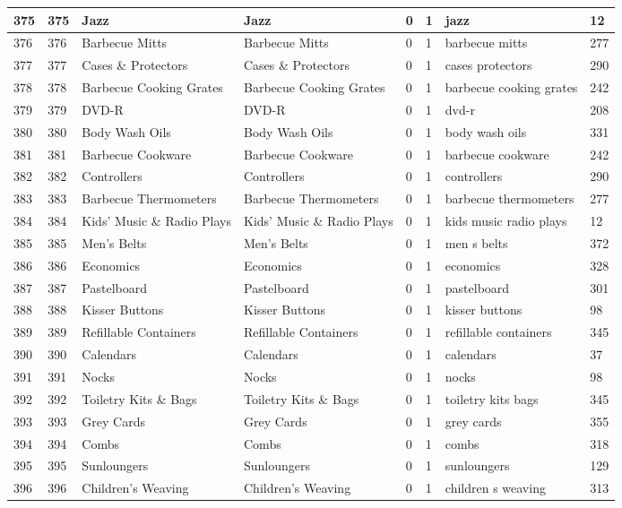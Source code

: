\begin{longtable}{|l|l|l|l|l|l|l|l|}
375 & 375 & Jazz & Jazz & 0 & 1 & jazz & 12 \\ \hline 
376 & 376 & Barbecue Mitts & Barbecue Mitts & 0 & 1 & barbecue mitts & 277 \\ \hline 
377 & 377 & Cases \& Protectors & Cases \& Protectors & 0 & 1 & cases protectors & 290 \\ \hline 
378 & 378 & Barbecue Cooking Grates & Barbecue Cooking Grates & 0 & 1 & barbecue cooking grates & 242 \\ \hline 
379 & 379 & DVD-R & DVD-R & 0 & 1 & dvd-r & 208 \\ \hline 
380 & 380 & Body Wash Oils & Body Wash Oils & 0 & 1 & body wash oils & 331 \\ \hline 
381 & 381 & Barbecue Cookware & Barbecue Cookware & 0 & 1 & barbecue cookware & 242 \\ \hline 
382 & 382 & Controllers & Controllers & 0 & 1 & controllers & 290 \\ \hline 
383 & 383 & Barbecue Thermometers & Barbecue Thermometers & 0 & 1 & barbecue thermometers & 277 \\ \hline 
384 & 384 & Kids' Music \& Radio Plays & Kids' Music \& Radio Plays & 0 & 1 & kids music radio plays & 12 \\ \hline 
385 & 385 & Men's Belts & Men's Belts & 0 & 1 & men s belts & 372 \\ \hline 
386 & 386 & Economics & Economics & 0 & 1 & economics & 328 \\ \hline 
387 & 387 & Pastelboard & Pastelboard & 0 & 1 & pastelboard & 301 \\ \hline 
388 & 388 & Kisser Buttons & Kisser Buttons & 0 & 1 & kisser buttons & 98 \\ \hline 
389 & 389 & Refillable Containers & Refillable Containers & 0 & 1 & refillable containers & 345 \\ \hline 
390 & 390 & Calendars & Calendars & 0 & 1 & calendars & 37 \\ \hline 
391 & 391 & Nocks & Nocks & 0 & 1 & nocks & 98 \\ \hline 
392 & 392 & Toiletry Kits \& Bags & Toiletry Kits \& Bags & 0 & 1 & toiletry kits bags & 345 \\ \hline 
393 & 393 & Grey Cards & Grey Cards & 0 & 1 & grey cards & 355 \\ \hline 
394 & 394 & Combs & Combs & 0 & 1 & combs & 318 \\ \hline 
395 & 395 & Sunloungers & Sunloungers & 0 & 1 & sunloungers & 129 \\ \hline 
396 & 396 & Children's Weaving & Children's Weaving & 0 & 1 & children s weaving & 313 \\ \hline 

\end{longtable}
